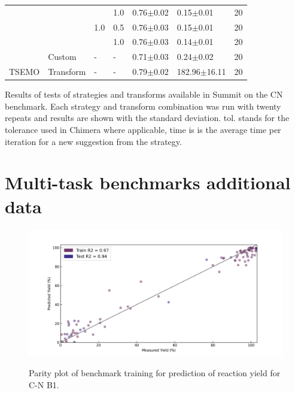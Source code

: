 \begin{sidewwaystable}[]
\begin{tabular}{lllllll}
              &           &     & 1.0 &        0.76$\pm$0.02 &      0.15$\pm$0.01 &       20 \\
              &           & 1.0 & 0.5 &        0.76$\pm$0.03 &      0.15$\pm$0.01 &       20 \\
              &           &     & 1.0 &        0.76$\pm$0.03 &      0.14$\pm$0.01 &       20 \\
              & Custom & - & - &        0.71$\pm$0.03 &      0.24$\pm$0.02 &       20 \\
        TSEMO & Transform & - & - &        0.79$\pm$0.02 &   182.96$\pm$16.11 &       20 \\
    \end{tabular}
    \caption{Results of tests of strategies and transforms available in Summit on the CN benchmark. Each strategy and transform combination was run with twenty repeats and results are shown with the standard deviation. tol. stands for the tolerance used in Chimera where applicable, time is is the average time per iteration for a new suggestion from the strategy.}
    \label{tab:cn_benchmark}
\end{sidewwaystable}

\section{Multi-task benchmarks additional data}

\begin{figure}
\caption{Parity plot of benchmark training for prediction of reaction yield for C-N B1.}\includegraphics[width=1\textwidth]{gfx/Appendix/baumgartner_cn_case_1_parity_plot.png}
\label{fig:1}
\end{figure}


